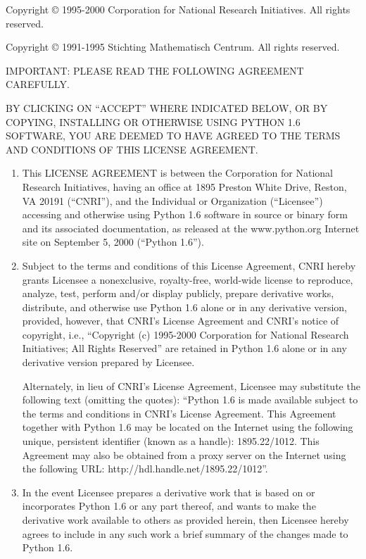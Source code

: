 Copyright \copyright{} 1995-2000 Corporation for National Research
Initiatives.  All rights reserved.

Copyright \copyright{} 1991-1995 Stichting Mathematisch Centrum.  All
rights reserved.

\centerline{}


IMPORTANT: PLEASE READ THE FOLLOWING AGREEMENT CAREFULLY.

BY CLICKING ON ``ACCEPT'' WHERE INDICATED BELOW, OR BY COPYING,
INSTALLING OR OTHERWISE USING PYTHON 1.6 SOFTWARE, YOU ARE DEEMED TO
HAVE AGREED TO THE TERMS AND CONDITIONS OF THIS LICENSE AGREEMENT.

\begin{enumerate}
\item
This LICENSE AGREEMENT is between the Corporation for National
Research Initiatives, having an office at 1895 Preston White Drive,
Reston, VA 20191 (``CNRI''), and the Individual or Organization
(``Licensee'') accessing and otherwise using Python 1.6 software in
source or binary form and its associated documentation, as released at
the www.python.org Internet site on September 5, 2000 (``Python 1.6'').

\item
Subject to the terms and conditions of this License Agreement, CNRI
hereby grants Licensee a nonexclusive, royalty-free, world-wide
license to reproduce, analyze, test, perform and/or display publicly,
prepare derivative works, distribute, and otherwise use Python 1.6
alone or in any derivative version, provided, however, that CNRI's
License Agreement and CNRI's notice of copyright, i.e., ``Copyright (c)
1995-2000 Corporation for National Research Initiatives; All Rights
Reserved'' are retained in Python 1.6 alone or in any derivative
version prepared by Licensee.

Alternately, in lieu of CNRI's License Agreement, Licensee may
substitute the following text (omitting the quotes): ``Python 1.6 is
made available subject to the terms and conditions in CNRI's License
Agreement.  This Agreement together with Python 1.6 may be located on
the Internet using the following unique, persistent identifier (known
as a handle): 1895.22/1012.  This Agreement may also be obtained from a
proxy server on the Internet using the following URL:
http://hdl.handle.net/1895.22/1012''.

\item
In the event Licensee prepares a derivative work that is based on
or incorporates Python 1.6 or any part thereof, and wants to make the
derivative work available to others as provided herein, then Licensee
hereby agrees to include in any such work a brief summary of the
changes made to Python 1.6.


\end{enumerate}
